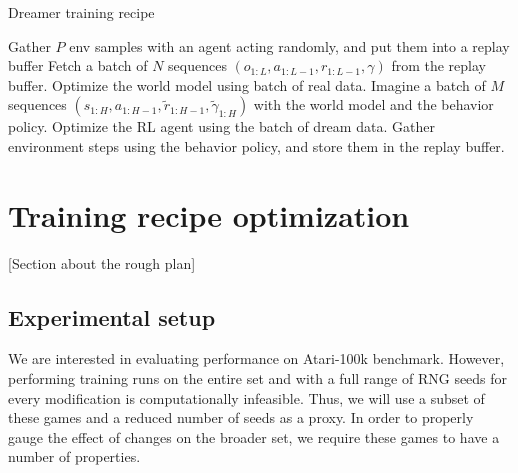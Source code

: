 \documentclass[twoside,11pt]{article}
\begin{document}
\begin{algorithm}
  \caption{Dreamer training recipe}
  \label{code:dreamer_loop}
  \begin{algorithmic}[1]
    \State Gather $P$ env samples with an agent acting randomly, and put them into a replay buffer
    \State Fetch a batch of $N$ sequences $(o_{1:L}, a_{1:L-1}, r_{1:L-1}, \gamma)$ from the replay buffer.
    \State Optimize the world model using batch of real data.
    \State Imagine a batch of $M$ sequences $(s_{1:H}, a_{1:H-1}, \widetilde{r}_{1:H-1}, \widetilde{\gamma}_{1:H})$ with the world model and the behavior policy.
    \State Optimize the RL agent using the batch of dream data.
    \State Gather environment steps using the behavior policy, and store them in the replay buffer.
    \EndWhile
  \end{algorithmic}
\end{algorithm}

\section{Training recipe optimization}

 [Section about the rough plan]

\subsection{Experimental setup}

We are interested in evaluating performance on Atari-100k benchmark. However, performing training runs on the entire set and with a full range of RNG seeds for every modification is computationally infeasible. Thus, we will use a subset of these games and a reduced number of seeds as a proxy. In order to properly gauge the effect of changes on the broader set, we require these games to have a number of properties.
\end{document}
